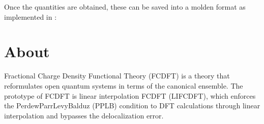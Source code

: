 \documentclass[letterpaper,10pt,english]{sphinxmanual}
\begin{document}
\begin{sphinxVerbatim}[commandchars=\\\{\}]
  
  
  
 
   
\end{sphinxVerbatim}

\sphinxAtStartPar
Once the quantities are obtained, these can be saved into a molden format as implemented in :

\begin{sphinxVerbatim}[commandchars=\\\{\}]
 
  
\end{sphinxVerbatim}

\sphinxstepscope


\chapter{About}
\label{\detokenize{about:about}}\label{\detokenize{about::doc}}
\sphinxAtStartPar
Fractional Charge Density Functional Theory (FC\sphinxhyphen{}DFT) is a theory that reformulates open quantum systems in terms of the canonical ensemble. The prototype of FC\sphinxhyphen{}DFT is linear interpolation FC\sphinxhyphen{}DFT (LI\sphinxhyphen{}FC\sphinxhyphen{}DFT), which enforces the Perdew\sphinxhyphen{}Parr\sphinxhyphen{}Levy\sphinxhyphen{}Balduz (PPLB) condition to DFT calculations through linear interpolation and bypasses the delocalization error.
\end{document}
